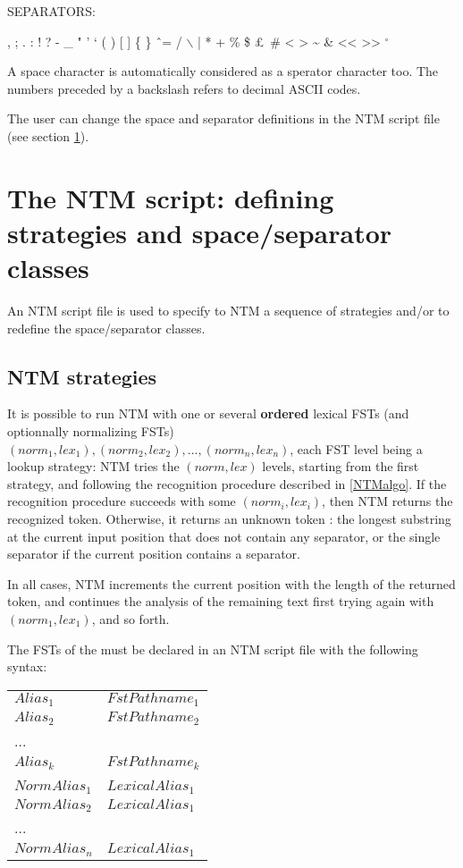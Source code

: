 \documentclass{article}
\begin{document}
SEPARATORS: \\
\begin{tt}
, ; . : ! ? - \_ " ' ` ( ) [ ] \{ \} \^ \   = / $\backslash$ | * + \% \$ \pounds \  \# < > \~{} \&  <<  >> $^\circ$
\end{tt}

\vspace{0.7cm}

A space character is automatically considered as a sperator character too. The numbers preceded by a backslash refers to decimal ASCII codes.

The user can change the space and separator definitions in the NTM script file (see section \ref{ntmscript}).


\section{The NTM script: defining strategies and space/separator classes}
\label{ntmscript}

An NTM script file is used to specify to NTM a sequence of strategies and/or to redefine the space/separator classes.

\subsection{NTM strategies}

It is possible to run NTM with one or several {\bf ordered} lexical FSTs (and optionnally normalizing FSTs) $(norm_1,lex_1),(norm_2,lex_2),...,(norm_n,lex_n)$, each FST level being a lookup strategy: NTM tries the $(norm,lex)$ levels, starting from the first strategy, and following the recognition procedure described in \ref{NTMalgo}. If the recognition procedure succeeds with some $(norm_i,lex_i)$, then NTM returns the recognized token. Otherwise, it returns an unknown token : the longest substring at the current input position that does not contain any separator, or the single separator if the current position contains a separator.

In all cases, NTM increments the current position with the length of the returned token, and continues the analysis of the remaining text first trying again with  $(norm_1,lex_1)$, and so forth.

The FSTs of the  must be declared in an NTM script file with the following syntax: \\


\begin{tabular}{ll}

$Alias_1$ &  $FstPathname_1$ \\
$Alias_2$ &  $FstPathname_2$ \\
... &  \\
$Alias_k$ &  $FstPathname_k$ \\
 &  \\
$NormAlias_1$ & $LexicalAlias_1$ \\
$NormAlias_2$ & $LexicalAlias_1$ \\
... &  \\
$NormAlias_n$ & $LexicalAlias_1$

\end{tabular}
\end{document}
